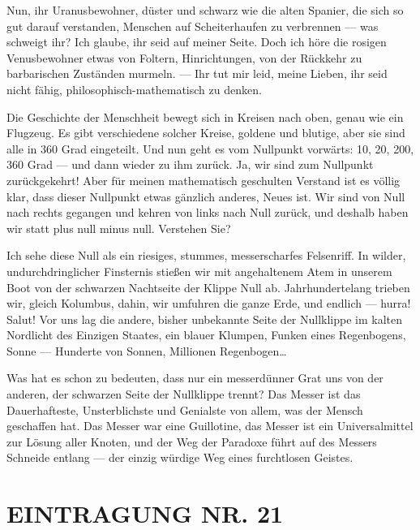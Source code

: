 Nun, ihr Uranusbewohner, düster und schwarz wie die alten Spanier,
die sich so gut darauf verstanden, Menschen auf Scheiterhaufen zu
verbrennen — was schweigt ihr? Ich glaube, ihr seid auf meiner
Seite. Doch ich höre die rosigen Venusbewohner etwas von Foltern,
Hinrichtungen, von der Rückkehr zu barbarischen Zuständen murmeln.
— Ihr tut mir leid, meine Lieben, ihr seid nicht fähig,
philosophisch-mathematisch zu denken.

Die Geschichte der Menschheit
bewegt sich in Kreisen nach oben, genau wie ein Flugzeug. Es gibt
verschiedene solcher Kreise, goldene und blutige, aber sie sind
alle in 360 Grad eingeteilt. Und nun geht es vom Nullpunkt
vorwärts: 10, 20, 200, 360 Grad — und dann wieder zu ihm zurück.
Ja, wir sind zum Nullpunkt zurückgekehrt! Aber für meinen
mathematisch geschulten Verstand ist es völlig klar, dass dieser
Nullpunkt etwas gänzlich anderes, Neues ist. Wir sind von Null nach
rechts gegangen und kehren von links nach Null zurück, und deshalb
haben wir statt plus null minus null. Verstehen Sie?

Ich sehe diese Null als ein riesiges, stummes, messerscharfes
Felsenriff. In wilder, undurchdringlicher Finsternis stießen wir
mit angehaltenem Atem in unserem Boot von der schwarzen Nachtseite
der Klippe Null ab. Jahrhundertelang trieben wir, gleich Kolumbus,
dahin, wir umfuhren die ganze Erde, und endlich — hurra! Salut! Vor
uns lag die andere, bisher unbekannte Seite der Nullklippe im
kalten Nordlicht des Einzigen Staates, ein blauer Klumpen, Funken
eines Regenbogens, Sonne — Hunderte von Sonnen, Millionen
Regenbogen\ldots{}

Was hat es schon zu bedeuten, dass nur ein
messerdünner Grat uns von der anderen, der schwarzen Seite der
Nullklippe trennt? Das Messer ist das Dauerhafteste, Unsterblichste
und Genialste von allem, was der Mensch geschaffen hat. Das Messer
war eine Guillotine, das Messer ist ein Universalmittel zur Lösung
aller Knoten, und der Weg der Paradoxe führt auf des Messers
Schneide entlang — der einzig würdige Weg eines furchtlosen
Geistes.

\section{EINTRAGUNG NR. 21}

